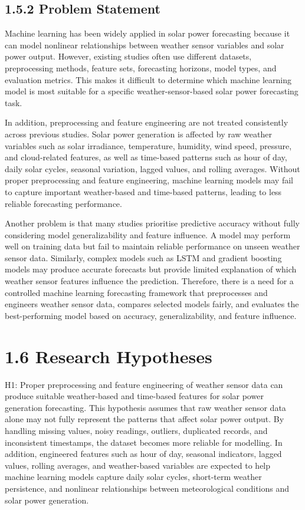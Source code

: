 \subsection{1.5.2 Problem Statement}

Machine learning has been widely applied in solar power forecasting because it can model nonlinear relationships between weather sensor variables and solar power output. However, existing studies often use different datasets, preprocessing methods, feature sets, forecasting horizons, model types, and evaluation metrics. This makes it difficult to determine which machine learning model is most suitable for a specific weather-sensor-based solar power forecasting task.

In addition, preprocessing and feature engineering are not treated consistently across previous studies. Solar power generation is affected by raw weather variables such as solar irradiance, temperature, humidity, wind speed, pressure, and cloud-related features, as well as time-based patterns such as hour of day, daily solar cycles, seasonal variation, lagged values, and rolling averages. Without proper preprocessing and feature engineering, machine learning models may fail to capture important weather-based and time-based patterns, leading to less reliable forecasting performance.

Another problem is that many studies prioritise predictive accuracy without fully considering model generalizability and feature influence. A model may perform well on training data but fail to maintain reliable performance on unseen weather sensor data. Similarly, complex models such as LSTM and gradient boosting models may produce accurate forecasts but provide limited explanation of which weather sensor features influence the prediction. Therefore, there is a need for a controlled machine learning forecasting framework that preprocesses and engineers weather sensor data, compares selected models fairly, and evaluates the best-performing model based on accuracy, generalizability, and feature influence.

\section{1.6 Research Hypotheses}

H1: Proper preprocessing and feature engineering of weather sensor data can produce suitable weather-based and time-based features for solar power generation forecasting. This hypothesis assumes that raw weather sensor data alone may not fully represent the patterns that affect solar power output. By handling missing values, noisy readings, outliers, duplicated records, and inconsistent timestamps, the dataset becomes more reliable for modelling. In addition, engineered features such as hour of day, seasonal indicators, lagged values, rolling averages, and weather-based variables are expected to help machine learning models capture daily solar cycles, short-term weather persistence, and nonlinear relationships between meteorological conditions and solar power generation.

